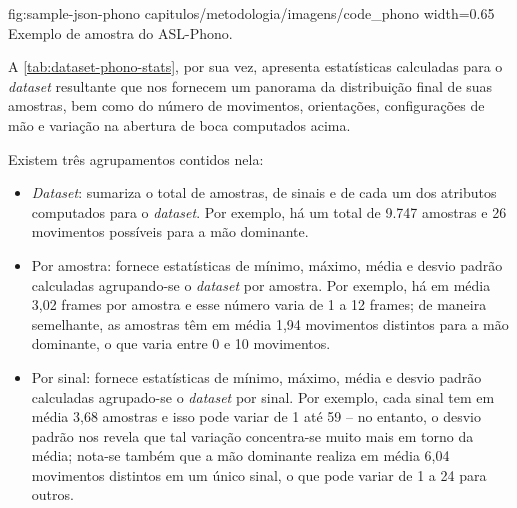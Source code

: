 \figura
{fig:sample-json-phono} %
{capitulos/metodologia/imagens/code_phono} %
{width=0.65\linewidth} %
{Exemplo de amostra do ASL-Phono.} %
{} %


A \autoref{tab:dataset-phono-stats}, por sua vez, apresenta estatísticas calculadas para o \textit{dataset} resultante que nos fornecem um panorama da distribuição final de suas amostras, bem como do número de movimentos, orientações, configurações de mão e variação na abertura de boca computados acima.




Existem três agrupamentos contidos nela:

\begin{itemize}
    \item \textit{Dataset}: sumariza o total de amostras, de sinais e de cada um dos atributos computados para o \textit{dataset}.
          Por exemplo, há um total de 9.747 amostras e 26 movimentos possíveis para a mão dominante.

    \item Por amostra: fornece estatísticas de mínimo, máximo, média e desvio padrão calculadas agrupando-se o \textit{dataset} por amostra.
        Por exemplo, há em média 3,02 frames por amostra e esse número varia de 1 a 12 frames; de maneira semelhante, as amostras têm em média 1,94 movimentos distintos para a mão dominante, o que varia entre 0 e 10 movimentos.
    

    \item Por sinal: fornece estatísticas de mínimo, máximo, média e desvio padrão calculadas agrupado-se o \textit{dataset} por sinal.
        Por exemplo, cada sinal tem em média 3,68 amostras e isso pode variar de 1 até 59 -- no entanto, o desvio padrão nos revela que tal variação concentra-se muito mais em torno da média; nota-se também que a mão dominante realiza em média 6,04 movimentos distintos em um único sinal, o que pode variar de 1 a 24 para outros.

\end{itemize}



